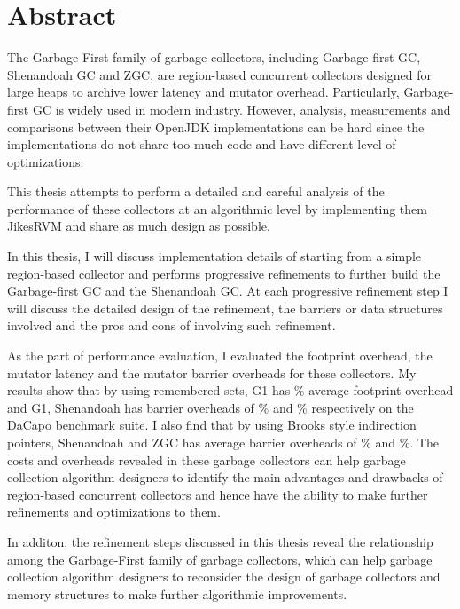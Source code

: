 \chapter*{Abstract}
\vspace{-1em}

The Garbage-First family of garbage collectors, including Garbage-first GC,
Shenandoah GC and ZGC, are region-based concurrent collectors designed for
large heaps to archive lower latency and mutator overhead.
Particularly, Garbage-first GC is widely used in modern industry.
However, analysis, measurements and comparisons between their OpenJDK implementations can be
hard since the implementations do not share too much code and have different
level of optimizations.

This thesis attempts to perform a detailed and
careful analysis of the performance of these collectors at an algorithmic level
by implementing them JikesRVM and share as much design as possible.

In this thesis, I will discuss implementation details of starting from a simple region-based
collector and performs progressive refinements to further build the Garbage-first GC
and the Shenandoah GC. At each progressive refinement step I will discuss the detailed
design of the refinement, the barriers or data structures involved and the pros and cons
of involving such refinement.

As the part of performance evaluation, I evaluated the footprint overhead,
the mutator latency and the mutator barrier overheads for these collectors.
My results show that by using remembered-sets, G1 has \% average footprint overhead
and G1, Shenandoah has barrier overheads of \% and \%
respectively on the DaCapo benchmark suite. I also find that by using Brooks
style indirection pointers, Shenandoah and ZGC has average barrier overheads
of \% and \%. The costs and overheads revealed in these
garbage collectors can help garbage collection algorithm designers to identify
the main advantages and drawbacks of region-based concurrent collectors and
hence have the ability to make further refinements and optimizations to them.

In additon, the refinement steps discussed in this thesis reveal the relationship
among the Garbage-First family of garbage collectors, which can help garbage collection algorithm designers
to reconsider the design of garbage collectors and memory structures to make further algorithmic improvements.

